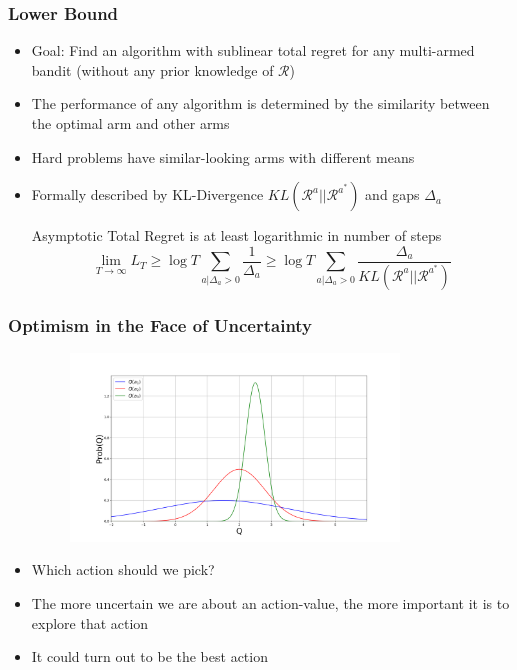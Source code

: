 \documentclass[handout]{beamer}
\begin{document}
\begin{frame}
\frametitle{Lower Bound}
\pause
\begin{itemize}[<+->]
\item Goal: Find an algorithm with sublinear total regret for any multi-armed bandit (without any prior knowledge of $\mathcal{R}$)
\item The performance of any algorithm is determined by the similarity between the optimal arm and other arms
\item Hard problems have similar-looking arms with different means
\item Formally described by KL-Divergence $KL(\mathcal{R}^a||\mathcal{R}^{a^*})$ and gaps $\Delta_a$
\begin{theorem}
Asymptotic Total Regret is at least logarithmic in number of steps
$$\lim_{T\rightarrow \infty} L_T \geq \log T \sum_{a|\Delta_a > 0} \frac 1 {\Delta_a}  \geq \log T  \sum_{a|\Delta_a > 0} \frac {\Delta_a} {KL(\mathcal{R}^a||\mathcal{R}^{a^*})}$$
\end{theorem}
\end{itemize}
\end{frame}

\begin{frame}
\frametitle{Optimism in the Face of Uncertainty}
\pause
\includegraphics[width=12cm, height=5cm]{q_pdfs1.png}
\begin{itemize}[<+->]
\item Which action should we pick?
\item The more uncertain we are about an action-value, the more important it is to explore that action
\item It could turn out to be the best action
\end{itemize}
\end{frame}
\end{document}
